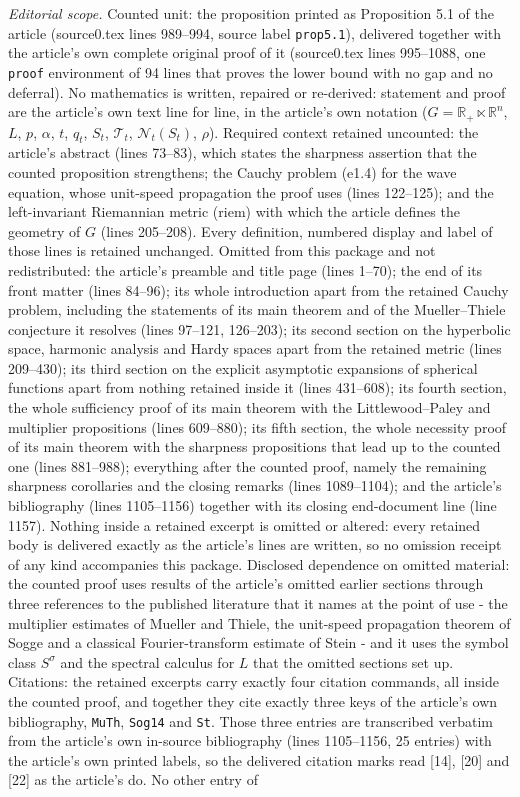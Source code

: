 \documentclass[10pt,a4paper]{amsart}
\newcommand{\R}{\mathbb{R}}
\begin{document}
\noindent\textit{Editorial scope.} Counted unit: the proposition printed as Proposition 5.1 of the article (source0.tex lines 989--994, source label \texttt{prop5.1}), delivered together with the article's own complete original proof of it (source0.tex lines 995--1088, one \texttt{proof} environment of 94 lines that proves the lower bound with no gap and no deferral). No mathematics is written, repaired or re-derived: statement and proof are the article's own text line for line, in the article's own notation ($G=\R_+\ltimes\R^n$, $L$, $p$, $\alpha$, $t$, $q_t$, $S_t$, $\mathcal T_t$, $\mathcal N_t(S_t)$, $\rho$). Required context retained uncounted: the article's abstract (lines 73--83), which states the sharpness assertion that the counted proposition strengthens; the Cauchy problem (e1.4) for the wave equation, whose unit-speed propagation the proof uses (lines 122--125); and the left-invariant Riemannian metric (riem) with which the article defines the geometry of $G$ (lines 205--208). Every definition, numbered display and label of those lines is retained unchanged. Omitted from this package and not redistributed: the article's preamble and title page (lines 1--70); the end of its front matter (lines 84--96); its whole introduction apart from the retained Cauchy problem, including the statements of its main theorem and of the Mueller--Thiele conjecture it resolves (lines 97--121, 126--203); its second section on the hyperbolic space, harmonic analysis and Hardy spaces apart from the retained metric (lines 209--430); its third section on the explicit asymptotic expansions of spherical functions apart from nothing retained inside it (lines 431--608); its fourth section, the whole sufficiency proof of its main theorem with the Littlewood--Paley and multiplier propositions (lines 609--880); its fifth section, the whole necessity proof of its main theorem with the sharpness propositions that lead up to the counted one (lines 881--988); everything after the counted proof, namely the remaining sharpness corollaries and the closing remarks (lines 1089--1104); and the article's bibliography (lines 1105--1156) together with its closing end-document line (line 1157). Nothing inside a retained excerpt is omitted or altered: every retained body is delivered exactly as the article's lines are written, so no omission receipt of any kind accompanies this package. Disclosed dependence on omitted material: the counted proof uses results of the article's omitted earlier sections through three references to the published literature that it names at the point of use - the multiplier estimates of Mueller and Thiele, the unit-speed propagation theorem of Sogge and a classical Fourier-transform estimate of Stein - and it uses the symbol class $S^\sigma$ and the spectral calculus for $L$ that the omitted sections set up. Citations: the retained excerpts carry exactly four citation commands, all inside the counted proof, and together they cite exactly three keys of the article's own bibliography, \texttt{MuTh}, \texttt{Sog14} and \texttt{St}. Those three entries are transcribed verbatim from the article's own in-source bibliography (lines 1105--1156, 25 entries) with the article's own printed labels, so the delivered citation marks read [14], [20] and [22] as the article's do. No other entry of 
\end{document}
